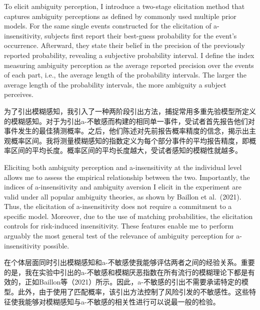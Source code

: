 \documentclass[12pt,a4paper]{article}
\newenvironment{original}
  {\par\medskip\noindent\color{black}\ignorespaces}
  {\par\medskip}
\newenvironment{translation}
  {\par\noindent\color{transblue}\ignorespaces}
  {\par\medskip\medskip}
\begin{document}
\begin{original}
To elicit ambiguity perception, I introduce a two-stage elicitation method that captures ambiguity perceptions as defined by commonly used multiple prior models. For the same single events constructed for the elicitation of a-insensitivity, subjects first report their best-guess probability for the event's occurrence. Afterward, they state their belief in the precision of the previously reported probability, revealing a subjective probability interval. I define the index measuring ambiguity perception as the average reported precision over the events of each part, i.e., the average length of the probability intervals. The larger the average length of the probability intervals, the more ambiguity a subject perceives.
\end{original}

\begin{translation}
为了引出模糊感知，我引入了一种两阶段引出方法，捕捉常用多重先验模型所定义的模糊感知。对于为引出a-不敏感而构建的相同单一事件，受试者首先报告他们对事件发生的最佳猜测概率。之后，他们陈述对先前报告概率精度的信念，揭示出主观概率区间。我将测量模糊感知的指数定义为每个部分事件的平均报告精度，即概率区间的平均长度。概率区间的平均长度越大，受试者感知的模糊性就越多。
\end{translation}

\begin{original}
Eliciting both ambiguity perception and a-insensitivity at the individual level allows me to assess the empirical relationship between the two. Importantly, the indices of a-insensitivity and ambiguity aversion I elicit in the experiment are valid under all popular ambiguity theories, as shown by Baillon et al.\ (2021). Thus, the elicitation of a-insensitivity does not require a commitment to a specific model. Moreover, due to the use of matching probabilities, the elicitation controls for risk-induced insensitivity. These features enable me to perform arguably the most general test of the relevance of ambiguity perception for a-insensitivity possible.
\end{original}

\begin{translation}
在个体层面同时引出模糊感知和a-不敏感使我能够评估两者之间的经验关系。重要的是，我在实验中引出的a-不敏感和模糊厌恶指数在所有流行的模糊理论下都是有效的，正如Baillon等（2021）所示。因此，a-不敏感的引出不需要承诺特定的模型。此外，由于使用了匹配概率，该引出方法控制了风险引发的不敏感性。这些特征使我能够对模糊感知与a-不敏感的相关性进行可以说最一般的检验。
\end{translation}
\end{document}

